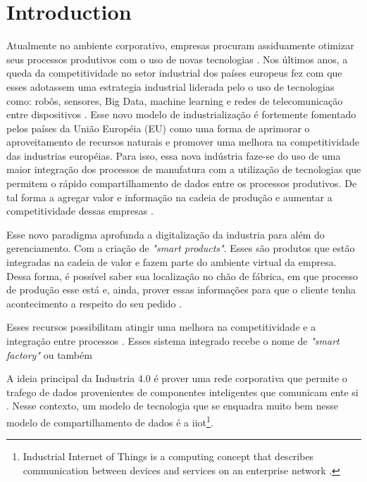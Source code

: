 \chapter{Introduction}\label{cap:intro}

Atualmente no ambiente corporativo, empresas procuram assiduamente otimizar seus processos produtivos com o uso de novas tecnologias \cite{JewapatarakulDigitalTransformation, DingEffectsofIoT, GUNTHER2017191}. Nos últimos anos, a queda da competitividade no setor industrial dos países europeus fez com que esses adotassem uma estrategia industrial liderada pelo o uso de tecnologias como: robôs, sensores, Big Data, machine learning e redes de telecomunicação entre dispositivos \cite{HerreroMeasuringTheEffectivenessOfIndustrialProcesses}. Esse novo modelo de industrialização é fortemente fomentado pelos países da União Européia (EU) como uma forma de aprimorar o aproveitamento de recursos naturais e promover uma melhora na competitividade das industrias européias. Para isso, essa nova indústria faze-se do uso de uma maior integração dos processos de manufatura com a utilização de tecnologias que permitem o rápido compartilhamento de dados entre os processos produtivos. De tal forma a agregar valor e informação na cadeia de produção e aumentar a competitividade dessas empresas \cite{Grabowska+2020+90+96}.

Esse novo paradigma aprofunda a digitalização da industria para além do gerenciamento. Com a criação de  \emph{"smart products"}. Esses são produtos que estão integradas na cadeia de valor e fazem parte do ambiente virtual da empresa. Dessa forma, é possível saber sua localização no chão de fábrica, em que processo de produção esse está e, ainda, prover essas informações para que o cliente tenha acontecimento a respeito do seu pedido \cite{economies6030046}.

Esses recursos possibilitam atingir uma melhora na competitividade e a integração entre processos \cite{SeungSME}.
Esses sistema integrado recebe o nome de \emph{"smart factory"}  ou também 

A ideia principal da Industria 4.0 é prover uma  rede corporativa que permite o trafego de dados provenientes de componentes inteligentes que comunicam ente si \cite{Grabowska+2020+90+96}. Nesse contexto, um modelo de tecnologia que se enquadra muito bem nesse modelo de compartilhamento de dados é a \acrfull{iiot}\footnote{Industrial Internet of Things is a computing concept that describes communication between devices and services on an enterprise network \cite{Sisinni8401919}.}\cite{GARG2022286}. 


